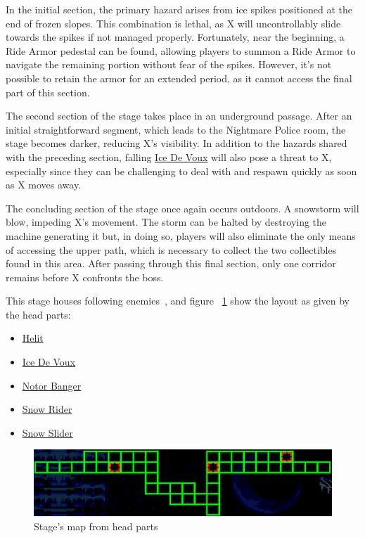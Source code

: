 In the initial section, the primary hazard arises from ice spikes positioned at the end of frozen slopes. This combination is lethal, as X will uncontrollably slide towards the spikes if not managed properly. Fortunately, near the beginning, a Ride Armor pedestal can be found, allowing players to summon a Ride Armor to navigate the remaining portion without fear of the spikes. However, it's not possible to retain the armor for an extended period, as it cannot access the final part of this section.

The second section of the stage takes place in an underground passage. After an initial straightforward segment, which leads to the Nightmare Police room, the stage becomes darker, reducing X's visibility. In addition to the hazards shared with the preceding section, falling \hyperlink{enem:Ice_De_Voux}{Ice De Voux}  will also pose a threat to X, especially since they can be challenging to deal with and respawn quickly as soon as X moves away.

The concluding section of the stage once again occurs outdoors. A snowstorm will blow, impeding X's movement. The storm can be halted by destroying the machine generating it but,  in doing so, players will also eliminate the only means of accessing the upper path, which is necessary to collect the two collectibles found in this area. After passing through this final section, only one corridor remains before X confronts the boss.

This stage houses following enemies~\cite{wiki:Frozen_Town}, and figure ~\ref{fig:Frozen_town_map} show the layout as given by the head parts:
\begin{itemize}
	\item \hyperlink{enem:Helit}{Helit}
	\item \hyperlink{enem:Ice_De_Voux}{Ice De Voux} 
	\item \hyperlink{enem:Notor_Banger}{Notor Banger} 
	\item \hyperlink{enem:Snow_Rider}{Snow Rider} 
	\item \hyperlink{enem:Snow_Slider}{Snow Slider}
\end{itemize}

\begin{figure}[htp]
	\centering
	\includegraphics[width=.7\linewidth]{figures/X3/Blizzard_buffalo/Map.jpg}
	\caption{Stage's map from head parts}
	\label{fig:Frozen_town_map}
\end{figure}

